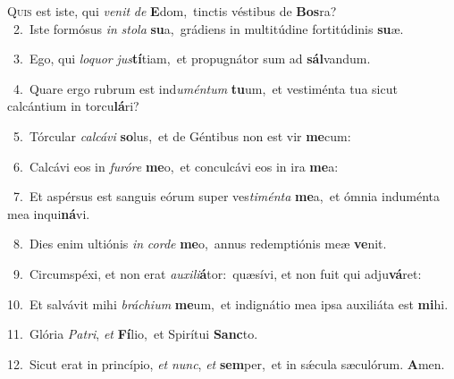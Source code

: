 \lettrine{\initial\textcolor{\initialcolor}{Q}}{uis} est iste, qui \textit{ve}\-\textit{nit} \textit{de} \textbf{E}\-dom,~\star tinctis véstibus de \textbf{Bos}\-ra?\\
{\numbfont\textcolor{\numbcolor}{~2.}}~Iste formósus \textit{in} \textit{sto}\-\textit{la} \textbf{su}\-a,~\star grádiens in multitúdine fortitúdinis \textbf{su}\-æ.\par
{\numbfont\textcolor{\numbcolor}{~3.}}~Ego, qui \textit{lo}\-\textit{quor} \textit{jus}\-\textbf{tí}tiam,~\star et propugnátor sum ad \textbf{sál}\-vandum.\par
{\numbfont\textcolor{\numbcolor}{~4.}}~Quare ergo rubrum est ind\-\textit{u}\-\textit{mén}\textit{tum} \textbf{tu}\-um,~\star et vestiménta tua sicut calcántium in torcu\-\textbf{lá}\-ri?\par
{\numbfont\textcolor{\numbcolor}{~5.}}~Tórcular \textit{cal}\-\textit{cá}\textit{vi} \textbf{so}\-lus,~\star et de Géntibus non est vir \textbf{me}\-cum:\par
{\numbfont\textcolor{\numbcolor}{~6.}}~Calcávi eos in \textit{fu}\-\textit{ró}\textit{re} \textbf{me}\-o,~\star et conculcávi eos in ira \textbf{me}\-a:\par
{\numbfont\textcolor{\numbcolor}{~7.}}~Et aspérsus est sanguis eórum super ves\-\textit{ti}\-\textit{mén}\textit{ta} \textbf{me}\-a,~\star et ómnia induménta mea inqui\-\textbf{ná}\-vi.\par
{\numbfont\textcolor{\numbcolor}{~8.}}~Dies enim ultiónis \textit{in} \textit{cor}\-\textit{de} \textbf{me}\-o,~\star annus redemptiónis meæ \textbf{ve}\-nit.\par
{\numbfont\textcolor{\numbcolor}{~9.}}~Circumspéxi, et non erat \textit{au}\-\textit{xi}\textit{li}\textbf{á}tor:~\star quæsívi, et non fuit qui adju\-\textbf{vá}\-ret:\par
{\numbfont\textcolor{\numbcolor}{10.}}~Et salvávit mihi \textit{brá}\-\textit{chi}\textit{um} \textbf{me}\-um,~\star et indignátio mea ipsa auxiliáta est \textbf{mi}\-hi.\par
{\numbfont\textcolor{\numbcolor}{11.}}~Glória \textit{Pa}\-\textit{tri}, \textit{et} \textbf{Fí}\-lio,~\star et Spirítui \textbf{Sanc}\-to.\par
{\numbfont\textcolor{\numbcolor}{12.}}~Sicut erat in princípio, \textit{et} \textit{nunc}\-, \textit{et} \textbf{sem}\-per,~\star et in sǽcula sæculórum. \textbf{A}\-men.\par
